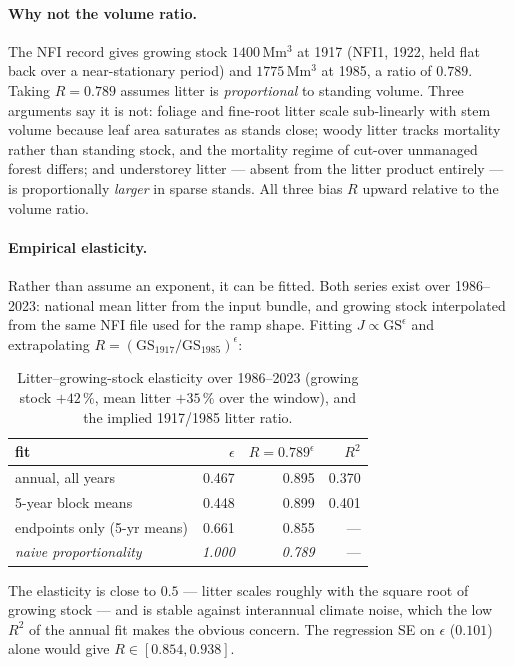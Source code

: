 \documentclass[11pt]{article}
\begin{document}
\paragraph{Why not the volume ratio.} The NFI record gives growing stock $1400$\,Mm$^3$ at 1917
(NFI1, 1922, held flat back over a near-stationary period) and $1775$\,Mm$^3$ at 1985, a ratio
of $0.789$. Taking $R = 0.789$ assumes litter is \emph{proportional} to standing volume. Three
arguments say it is not: foliage and fine-root litter scale sub-linearly with stem volume
because leaf area saturates as stands close; woody litter tracks mortality rather than standing
stock, and the mortality regime of cut-over unmanaged forest differs; and understorey litter ---
absent from the litter product entirely --- is proportionally \emph{larger} in sparse stands.
All three bias $R$ upward relative to the volume ratio.

\paragraph{Empirical elasticity.} Rather than assume an exponent, it can be fitted. Both series
exist over 1986--2023: national mean litter from the input bundle, and growing stock
interpolated from the same NFI file used for the ramp shape. Fitting $J \propto \mathrm{GS}^{\epsilon}$
and extrapolating $R = (\mathrm{GS}_{1917}/\mathrm{GS}_{1985})^{\epsilon}$:

\begin{table}[H]\centering\small
\caption{Litter--growing-stock elasticity over 1986--2023 (growing stock $+42\,\%$, mean litter
$+35\,\%$ over the window), and the implied 1917/1985 litter ratio.}
\begin{tabular}{lrrr}
\toprule
fit & $\epsilon$ & $R = 0.789^{\epsilon}$ & $R^2$\\
\midrule
annual, all years          & 0.467 & 0.895 & 0.370\\
5-year block means         & 0.448 & 0.899 & 0.401\\
endpoints only (5-yr means)& 0.661 & 0.855 & ---\\
\midrule
\emph{naive proportionality} & \emph{1.000} & \emph{0.789} & ---\\
\bottomrule
\end{tabular}
\end{table}

\noindent The elasticity is close to $0.5$ --- litter scales roughly with the square root of
growing stock --- and is stable against interannual climate noise, which the low $R^2$ of the
annual fit makes the obvious concern. The regression SE on $\epsilon$ ($0.101$) alone would
give $R \in [0.854, 0.938]$.
\end{document}
